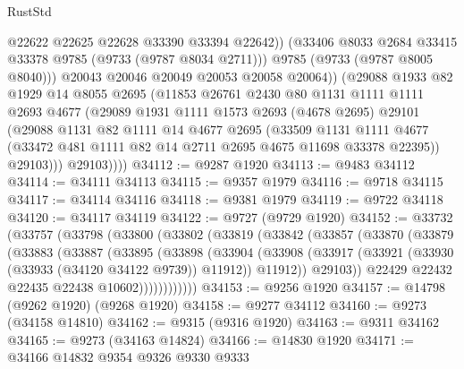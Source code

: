 \begin{lexlean}{RustStd}
\begin{coremodule}
                    @22622
                    @22625
                    @22628
                    @33390
                    @33394
                    @22642))
                (@33406 @8033 @2684 @33415 @33378 @9785 (@9733 (@9787 @8034 @2711)))
                @9785
                (@9733 (@9787 @8005 @8040)))
              @20043
              @20046
              @20049
              @20053
              @20058
              @20064))
          (@29088
            @1933
            @82
            @1929
            @14
            @8055
            @2695
            (@11853
              @26761
              @2430
              @80
              @1131
              @1111
              @1111
              @2693
              @4677
              (@29089
                @1931
                @1111
                @1573
                @2693
                (@4678 @2695)
                @29101
                (@29088
                  @1131
                  @82
                  @1111
                  @14
                  @4677
                  @2695
                  (@33509
                    @1131
                    @1111
                    @4677
                    (@33472 @481 @1111 @82 @14 @2711 @2695 @4675 @11698 @33378 @22395))
                  @29103)))
            @29103))))
@34112 := @9287 @1920
@34113 := @9483 @34112
@34114 := @34111 @34113
@34115 := @9357 @1979
@34116 := @9718 @34115
@34117 := @34114 @34116
@34118 := @9381 @1979
@34119 := @9722 @34118
@34120 := @34117 @34119
@34122 := @9727 (@9729 @1920)
@34152 := @33732
    (@33757
      (@33798
        (@33800
          (@33802
            (@33819
              (@33842
                (@33857
                  (@33870
                    (@33879
                      (@33883
                        (@33887
                          (@33895
                            (@33898
                              (@33904
                                (@33908
                                  (@33917
                                    (@33921 (@33930 (@33933 (@34120 @34122 @9739)) @11912))
                                    @11912))
                                @29103))
                            @22429
                            @22432
                            @22435
                            @22438
                            @10602))))))))))))
@34153 := @9256 @1920
@34157 := @14798 (@9262 @1920) (@9268 @1920)
@34158 := @9277 @34112
@34160 := @9273 (@34158 @14810)
@34162 := @9315 (@9316 @1920)
@34163 := @9311 @34162
@34165 := @9273 (@34163 @14824)
@34166 := @14830 @1920
@34171 := @34166 @14832 @9354 @9326 @9330 @9333

\end{coremodule}
\end{lexlean}
